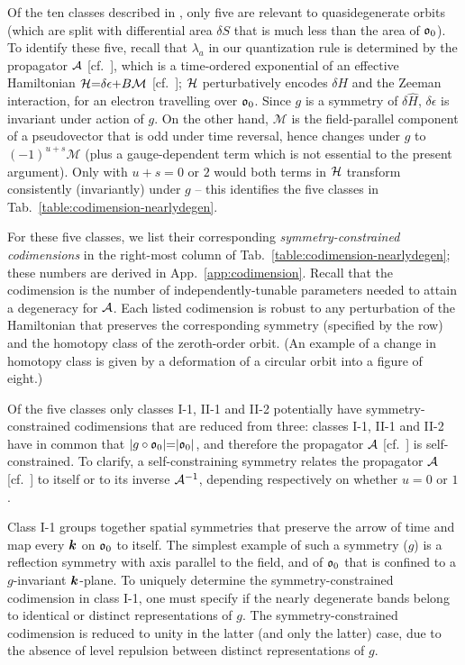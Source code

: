 \documentclass[aps, showpacs, twocolumn, notitlepage, superscriptaddress]{revtex4-1}
\begin{document}
Of the ten classes described in , only five   are relevant to quasidegenerate orbits (which are split with differential area  $\delta S$ that is much less than the area of $\mathfrak{o}_0$).
To identify these five, recall that $\lambda_a$ in our quantization rule is determined by the propagator ${\cal A}$ [cf.\ ], which is a time-ordered exponential of an effective Hamiltonian $\mathcal{H}{=}\delta\epsilon{+}B \mathcal{M}$ [cf.\ ]; $\mathcal{H}$ perturbatively encodes $\delta H$ and the Zeeman interaction, for an electron travelling over  $\mathfrak{o}_0$. Since $g$ is  a symmetry of  $\delta \hat{H}$, $\delta\epsilon$ is invariant under action of $g$. On the other hand, $\mathcal{M}$ is the field-parallel component of a pseudovector that is odd under time reversal\cite{sakurai1995modern}, hence changes under $g$ to  $(-1)^{u+s}\mathcal{M}$ (plus a gauge-dependent term\cite{100p} which is not essential to the present argument). Only with $u{+}s{=}0$ or $2$ would both terms in $\mathcal{H}$ transform consistently (invariantly) under $g$ -- this identifies the five classes in Tab.\ \ref{table:codimension-nearlydegen}.

For these five classes, we list their corresponding \textit{symmetry-constrained codimensions} in the right-most column of Tab.\ \ref{table:codimension-nearlydegen}; these numbers are derived in  App.\ \ref{app:codimension}. Recall that the codimension is the number of independently-tunable parameters needed to attain a degeneracy for ${\cal A}$. Each listed codimension is robust to any perturbation of the Hamiltonian that preserves the corresponding symmetry (specified by the row) and the homotopy class\cite{100p} of the zeroth-order orbit. (An example of a change in homotopy class is given by a deformation of a circular orbit into a figure of eight.) 

Of the five classes only classes I-1, II-1 and II-2 potentially have symmetry-constrained codimensions that are reduced from three: classes I-1, II-1 and II-2 have in common that  $|g\circ\mathfrak{o}_0|{=}|\mathfrak{o}_0|$, and therefore the propagator ${\cal A}$ [cf.\ ] is self-constrained. To clarify, a self-constraining symmetry relates the propagator ${\cal A}$ [cf.\ ] to itself or to its inverse ${\cal A}^{-1}$, depending respectively on whether $u{=}0$ or $1$.

Class I-1 groups together spatial symmetries that preserve the arrow of time and map every $\boldsymbol{k}$ on $\mathfrak{o}_0$ to itself. The simplest example of such a symmetry ($g$) is a reflection symmetry with axis parallel to the field, and of  $\mathfrak{o}_0$ that is confined to a $g$-invariant $\boldsymbol{k}$-plane. To uniquely determine the symmetry-constrained codimension in class I-1, one must specify if the nearly degenerate bands belong to identical or distinct representations of $g$. The symmetry-constrained codimension is reduced to unity in the latter (and only the latter) case, due to the absence of level repulsion between distinct representations of $g$. 
\end{document}
